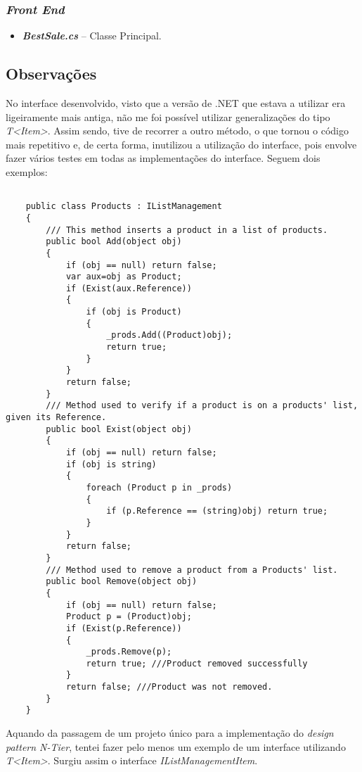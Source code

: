 \documentclass[11pt]{scrartcl} %
\begin{document}
\subsubsection{\textit{Front End}}
\begin{itemize}
	\item 
	\emph{\textbf{BestSale.cs}} -- Classe Principal.
\end{itemize}


\subsection{Observações}

No interface desenvolvido, visto que a versão de .NET que estava a utilizar era ligeiramente mais antiga, não me foi possível utilizar generalizações do tipo \textit{T<Item>}. Assim sendo, tive de recorrer a outro método, o que tornou o código mais repetitivo e, de certa forma, inutilizou a utilização do interface, pois envolve fazer vários testes em todas as implementações do interface. Seguem dois exemplos:

\begin{lstlisting}[language={[Sharp]C}, caption={Implementação do Interface}, label={Implementação do Interface}]
	
	public class Products : IListManagement
	{
		/// This method inserts a product in a list of products.
		public bool Add(object obj)
		{
			if (obj == null) return false;
			var aux=obj as Product;
			if (Exist(aux.Reference))
			{
				if (obj is Product)
				{
					_prods.Add((Product)obj);
					return true;
				}
			}
			return false;
		}
		/// Method used to verify if a product is on a products' list, given its Reference.
		public bool Exist(object obj)
		{
			if (obj == null) return false;
			if (obj is string)
			{
				foreach (Product p in _prods)
				{
					if (p.Reference == (string)obj) return true;
				}
			}
			return false;
		}
		/// Method used to remove a product from a Products' list.
		public bool Remove(object obj)
		{
			if (obj == null) return false;
			Product p = (Product)obj;
			if (Exist(p.Reference))
			{
				_prods.Remove(p);
				return true; ///Product removed successfully
			}
			return false; ///Product was not removed.
		}
	}
\end{lstlisting}

Aquando da passagem de um projeto único para a implementação do \textit{design pattern N-Tier}, tentei fazer pelo menos um exemplo de um interface utilizando \textit{T<Item>}. Surgiu assim o interface \textit{IListManagementItem}.
\end{document}
